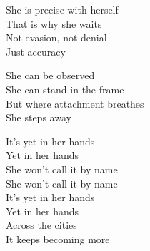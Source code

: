 \begin{lyrics}
She is precise with herself\\
That is why she waits\\
Not evasion, not denial\\
Just accuracy

She can be observed\\
She can stand in the frame\\
But where attachment breathes\\
She steps away

It’s yet in her hands\\
Yet in her hands\\
She won’t call it by name\\
She won’t call it by name\\
It’s yet in her hands\\
Yet in her hands\\
Across the cities\\
It keeps becoming more
\end{lyrics}
